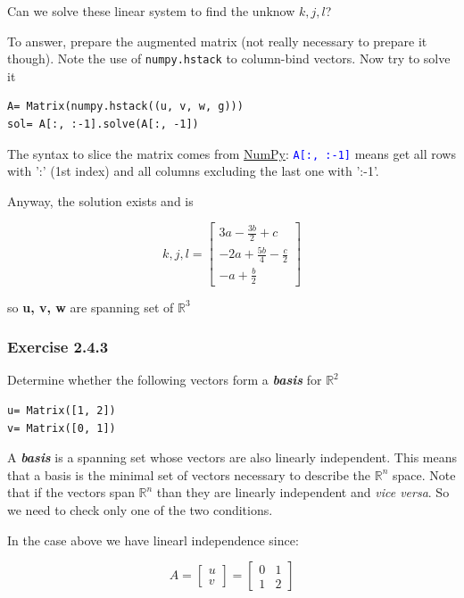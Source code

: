 Can we solve these linear system to find the unknow $k, j, l$?

To answer, prepare the augmented matrix (not really necessary to prepare it though).
Note the use of \texttt{numpy.hstack} to column-bind vectors. Now try to solve it

\begin{verbatim}
A= Matrix(numpy.hstack((u, v, w, g)))
sol= A[:, :-1].solve(A[:, -1])
\end{verbatim}

The syntax to slice the matrix comes from \href{http://docs.scipy.org/doc/numpy/reference/arrays.indexing.html}{NumPy}:
\textcolor{blue}{\texttt{A[:, :-1]}} means get all rows with ':' (1st index) and all columns
excluding the last one with ':-1'.

Anyway, the solution exists and is

$$
k, j, l= \left[\begin{matrix}3 a - \frac{3 b}{2} + c\\- 2 a + \frac{5 b}{4} - \frac{c}{2}\\- a + \frac{b}{2}\end{matrix}\right]
$$

so \textbf{u, v, w} are spanning set of $\mathbb{R}^3$

\subsubsection{Exercise 2.4.3}

Determine whether the following vectors form a \textbf{\textit{basis}} for $\mathbb{R}^2$

\begin{verbatim}
u= Matrix([1, 2])
v= Matrix([0, 1])
\end{verbatim}

A \textbf{\textit{basis}} is a spanning set whose vectors are also linearly independent.
This means that a basis is the minimal set of vectors necessary to describe the
$\mathbb{R}^n$ space. Note that if the vectors span $\mathbb{R}^n$ than they are
linearly independent and \emph{vice versa}. So we need to check only one of the two
conditions.

In the case above we have linearl independence since:

$$
A = \left[\begin{matrix}u\\v\end{matrix}\right]
= \left[\begin{matrix}0 & 1\\1 & 2\end{matrix}\right]
$$

